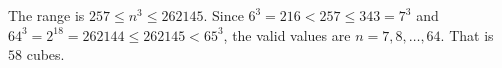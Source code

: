 The range is $257\le n^3\le262145$. Since $6^3=216<257\le343=7^3$ and $64^3=2^{18}=262144\le262145<65^3$, the valid values are $n=7,8,\dots,64$. That is $\boxed{58}$ cubes.
